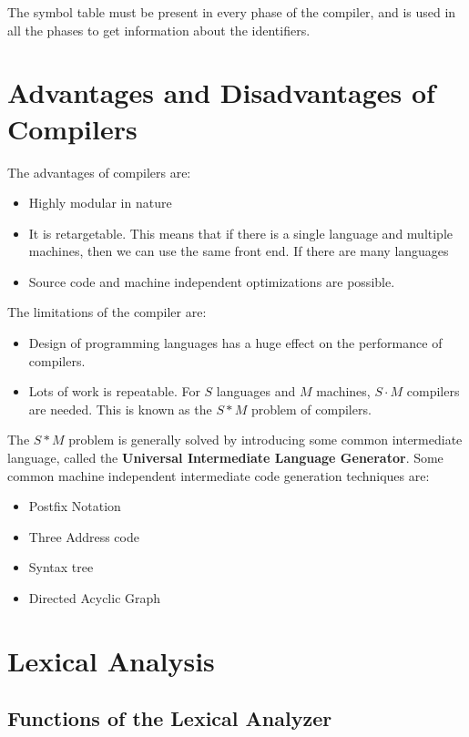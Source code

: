 \documentclass[12pt,letterpaper]{article}
\begin{document}
The symbol table must be present in every phase of the compiler, and is used in all the phases to get information about the identifiers.

\section{Advantages and Disadvantages of Compilers}

The advantages of compilers are:

\begin{itemize}
  \item Highly modular in nature
  \item It is retargetable. This means that if there is a single language and multiple machines, then we can use the same front end. If there are many languages
  \item Source code and machine independent optimizations are possible.
\end{itemize}

The limitations of the compiler are:

\begin{itemize}
  \item Design of programming languages has a huge effect on the performance of compilers.
  \item Lots of work is repeatable. For $S$ languages and $M$ machines, $S\cdot M$ compilers are needed. This is known as the $S*M$ problem of compilers.
\end{itemize}

The $S*M$ problem is generally solved by introducing some common intermediate language, called the \textbf{Universal Intermediate Language Generator}. Some common machine independent intermediate code generation techniques are:

\begin{itemize}
  \item Postfix Notation
  \item Three Address code
  \item Syntax tree
  \item Directed Acyclic Graph
\end{itemize}


\section{Lexical Analysis}

\subsection{Functions of the Lexical Analyzer}
\end{document}

